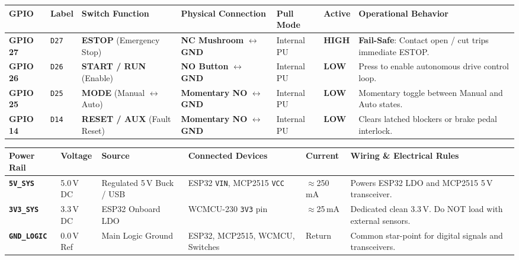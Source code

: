 \documentclass[10pt,a4paper]{article}
\begin{document}
\begin{tcolorbox}[bwcard, title={3. Classic ESP32 (esp32dev) to 4 Pilot Switches \& Digital Inputs}]
\begin{tabularx}{\textwidth}{@{} C{1.5cm} C{1.2cm} L{2.4cm} L{3.3cm} C{1.6cm} C{1.3cm} Y @{}}
\toprule
\textbf{GPIO} & \textbf{Label} & \textbf{Switch Function} & \textbf{Physical Connection} & \textbf{Pull Mode} & \textbf{Active} & \textbf{Operational Behavior} \\
\midrule
\textbf{GPIO 27} & \texttt{D27} & \textbf{ESTOP} (Emergency Stop) & \textbf{NC Mushroom} $\longleftrightarrow$ \textbf{GND} & Internal PU & \textbf{HIGH} & \textbf{Fail-Safe}: Contact open / cut trips immediate ESTOP. \\
\textbf{GPIO 26} & \texttt{D26} & \textbf{START / RUN} (Enable) & \textbf{NO Button} $\longleftrightarrow$ \textbf{GND} & Internal PU & \textbf{LOW} & Press to enable autonomous drive control loop. \\
\textbf{GPIO 25} & \texttt{D25} & \textbf{MODE} (Manual $\leftrightarrow$ Auto) & \textbf{Momentary NO} $\longleftrightarrow$ \textbf{GND} & Internal PU & \textbf{LOW} & Momentary toggle between Manual and Auto states. \\
\textbf{GPIO 14} & \texttt{D14} & \textbf{RESET / AUX} (Fault Reset)& \textbf{Momentary NO} $\longleftrightarrow$ \textbf{GND} & Internal PU & \textbf{LOW} & Clears latched blockers or brake pedal interlock. \\
\bottomrule
\end{tabularx}
\end{tcolorbox}

\vspace{-8pt}

\begin{tcolorbox}[bwcard, title={4. Power Distribution \& Ground Rails}]
\begin{tabularx}{\textwidth}{@{} L{2.0cm} C{1.4cm} L{3.2cm} L{3.6cm} C{1.5cm} Y @{}}
\toprule
\textbf{Power Rail} & \textbf{Voltage} & \textbf{Source} & \textbf{Connected Devices} & \textbf{Current} & \textbf{Wiring \& Electrical Rules} \\
\midrule
\textbf{\texttt{5V\_SYS}} & 5.0\,V DC & Regulated 5\,V Buck / USB & ESP32 \texttt{VIN}, MCP2515 \texttt{VCC} & $\approx$250\,mA & Powers ESP32 LDO and MCP2515 5\,V transceiver. \\
\textbf{\texttt{3V3\_SYS}} & 3.3\,V DC & ESP32 Onboard LDO & WCMCU-230 \texttt{3V3} pin & $\approx$25\,mA & Dedicated clean 3.3\,V. Do NOT load with external sensors. \\
\textbf{\texttt{GND\_LOGIC}} & 0.0\,V Ref & Main Logic Ground & ESP32, MCP2515, WCMCU, Switches & Return & Common star-point for digital signals and transceivers. \\
\bottomrule
\end{tabularx}
\end{tcolorbox}
\end{document}
